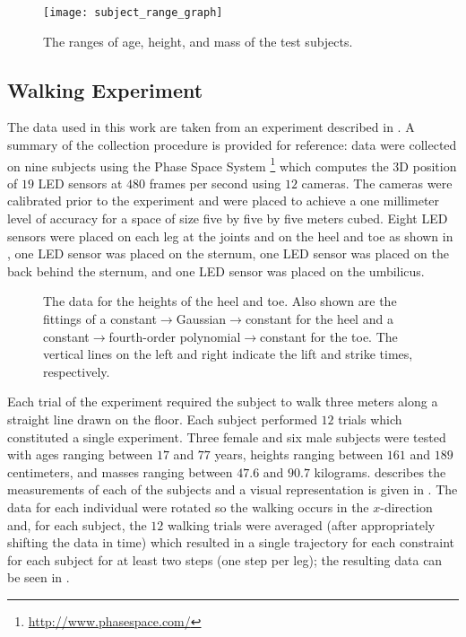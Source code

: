 

\begin{figure}[t!]
  \centering
  \texttt{[image: subject\_range\_graph]}
  \caption{The ranges of age, height, and mass of the test subjects.}
  \label{fig:subject-ranges}
\end{figure}

\subsection{Walking Experiment}
The data used in this work are taken from an experiment described in
\cite{Ames2011a}.
%
A summary of the collection procedure is provided for reference:
%
data were collected on nine subjects using the Phase Space System%
%
\footnote{\url{http://www.phasespace.com/}}\xspace
%
which computes the 3D position of $19$ LED sensors at $480$ frames per second
using $12$ cameras.
%
The cameras were calibrated prior to the experiment and were placed to achieve a
one millimeter level of accuracy for a space of size five by five by five meters
cubed.
%
Eight LED sensors were placed on each leg at the joints and on the heel and toe
as shown in , one LED sensor was placed on the sternum, one
LED sensor was placed on the back behind the sternum, and one LED sensor was
placed on the umbilicus.

\begin{figure}[t!]
  \centering
  \caption[The data for the heights of the heel and toe.]{The data for the
    heights of the heel and toe.
    Also shown are the fittings of a constant$\to$Gaussian$\to$constant for the
    heel and a constant$\to$fourth-order polynomial$\to$constant for the toe.
    The vertical lines on the left and right indicate the lift and strike times,
    respectively.}
  \label{fig:heeltoefit}
\end{figure}


Each trial of the experiment required the subject to walk three meters along a
straight line drawn on the floor.
%
Each subject performed $12$ trials which constituted a single experiment.
%
Three female and six male subjects were tested with ages ranging between $17$
and $77$ years, heights ranging between $161$ and $189$ centimeters, and masses
ranging between $47.6$ and $90.7$ kilograms.
%
 describes the measurements of each of the subjects and
a visual representation is given in .
%
The data for each individual were rotated so the walking occurs in the
$x$-direction and, for each subject, the $12$ walking trials were averaged
(after appropriately shifting the data in time) which resulted in a single
trajectory for each constraint for each subject for at least two steps (one step
per leg);
%
the resulting data can be seen in .

